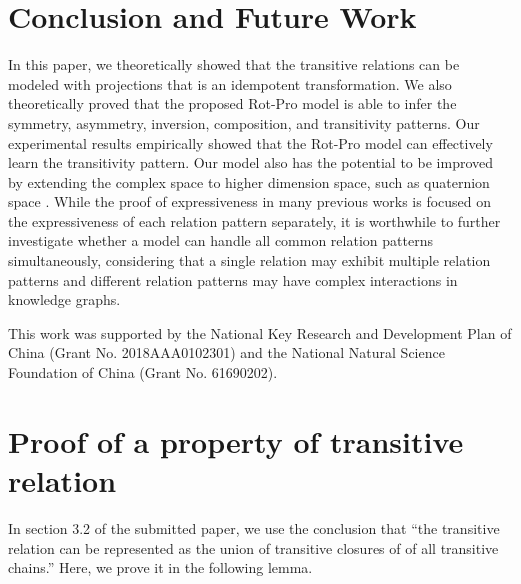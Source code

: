 \documentclass{article}
\begin{document}
\section{Conclusion and Future Work}
In this paper, we theoretically showed that the transitive relations can be modeled with projections that is an idempotent transformation. We also theoretically proved that the proposed Rot-Pro model is able to infer the symmetry, asymmetry, inversion, composition, and transitivity patterns. Our experimental results empirically showed that the Rot-Pro model can effectively learn the transitivity pattern. Our model also has the potential to be improved by extending the complex space to higher dimension space, such as quaternion space \cite{zhang2019quaternion, orthogonal}.
While the proof of expressiveness in many previous works is focused on the expressiveness of each relation pattern separately, it is worthwhile to further investigate whether a model can handle all common relation patterns simultaneously, considering that a single relation may exhibit multiple relation patterns and different relation patterns may have complex interactions in knowledge graphs.

\begin{ack}
This work was supported by the National Key Research and Development Plan of China (Grant No. 2018AAA0102301) and the National Natural Science Foundation of China (Grant
No. 61690202).
\end{ack}



\newpage
\appendix

\section{Proof of a property of transitive relation}

In section 3.2 of the submitted paper, we use the conclusion that ``the transitive relation can be represented as the union of transitive closures of of all transitive chains.'' Here, we prove it in the following lemma.
\end{document}
